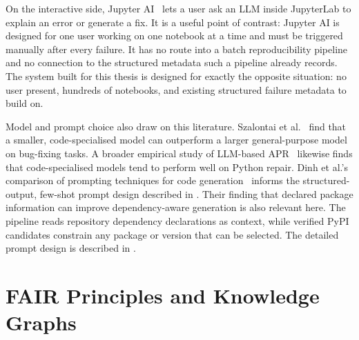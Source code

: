 On the interactive side, Jupyter AI~\cite{jupyterai2023} lets a user ask an
LLM inside JupyterLab to explain an error or generate a fix. It is a useful
point of contrast: Jupyter AI is designed for one user working on one
notebook at a time and must be triggered manually after every failure. It
has no route into a batch reproducibility pipeline and no connection to the
structured metadata such a pipeline already records. The system built for
this thesis is designed for exactly the opposite situation: no user present,
hundreds of notebooks, and existing structured failure metadata to build on.

Model and prompt choice also draw on this literature. Szalontai et
al.~\cite{szalontai2024codellama} find that a smaller, code-specialised
model can outperform a larger general-purpose model on bug-fixing tasks.
A broader empirical study of LLM-based APR~\cite{empiricalapr2025} likewise
finds that code-specialised models tend to perform well on Python repair.
Dinh et al.'s comparison of prompting techniques for code
generation~\cite{dinh2024codeprompteval} informs the structured-output,
few-shot prompt design described in . Their finding
that declared package information can improve dependency-aware generation is
also relevant here. The pipeline reads repository dependency declarations as
context, while verified PyPI candidates constrain any package or version that
can be selected. The detailed prompt design is described in
.

\section{FAIR Principles and Knowledge Graphs}
\label{sec:rw-fair}

